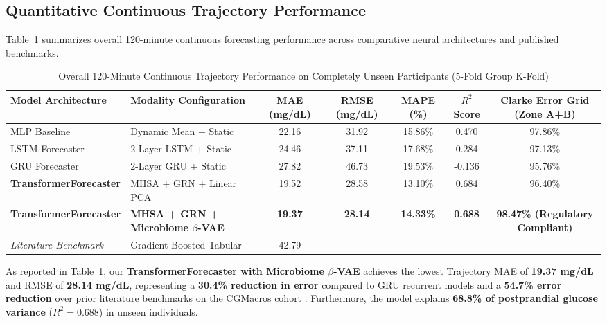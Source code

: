 \documentclass[conference]{IEEEtran}
\begin{document}
\subsection{Quantitative Continuous Trajectory Performance}
Table~\ref{tab:dl_benchmark} summarizes overall 120-minute continuous forecasting performance across comparative neural architectures and published benchmarks.

\begin{table}[!t]
\centering
\caption{Overall 120-Minute Continuous Trajectory Performance on Completely Unseen Participants (5-Fold Group K-Fold)}
\label{tab:dl_benchmark}
\begin{tabularx}{\textwidth}{l X c c c c c}
\toprule
\textbf{Model Architecture} & \textbf{Modality Configuration} & \textbf{MAE (mg/dL)} & \textbf{RMSE (mg/dL)} & \textbf{MAPE (\%)} & \textbf{$R^2$ Score} & \textbf{Clarke Error Grid (Zone A+B)} \\
\midrule
MLP Baseline & Dynamic Mean + Static & 22.16 & 31.92 & 15.86\% & 0.470 & 97.86\% \\
LSTM Forecaster & 2-Layer LSTM + Static & 24.46 & 37.11 & 17.68\% & 0.284 & 97.13\% \\
GRU Forecaster & 2-Layer GRU + Static & 27.82 & 46.73 & 19.53\% & -0.136 & 95.76\% \\
\midrule
\textbf{TransformerForecaster} & MHSA + GRN + Linear PCA & 19.52 & 28.58 & 13.10\% & 0.684 & 96.40\% \\
\textbf{TransformerForecaster} & \textbf{MHSA + GRN + Microbiome $\beta$-VAE} & \textbf{19.37} & \textbf{28.14} & \textbf{14.33\%} & \textbf{0.688} & \textbf{98.47\% (Regulatory Compliant)} \\
\midrule
\emph{Literature Benchmark \cite{mendes2024cgmacros}} & Gradient Boosted Tabular & 42.79 & --- & --- & --- & --- \\
\bottomrule
\end{tabularx}
\end{table}

As reported in Table~\ref{tab:dl_benchmark}, our \textbf{TransformerForecaster with Microbiome $\beta$-VAE} achieves the lowest Trajectory MAE of \textbf{19.37 mg/dL} and RMSE of \textbf{28.14 mg/dL}, representing a \textbf{30.4\% reduction in error} compared to GRU recurrent models and a \textbf{54.7\% error reduction} over prior literature benchmarks on the CGMacros cohort \cite{mendes2024cgmacros}. Furthermore, the model explains \textbf{68.8\% of postprandial glucose variance} ($R^2 = 0.688$) in unseen individuals.
\end{document}
